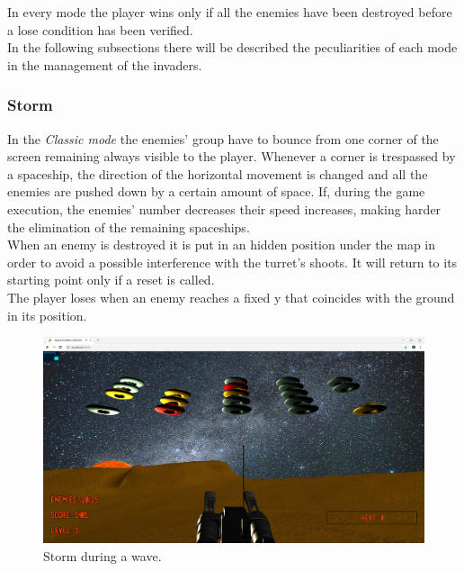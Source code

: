 In every mode the player wins only if all the enemies have been destroyed before a lose condition has been verified.\\
In the following subsections there will be described the peculiarities of each mode in the management of the invaders.

\subsubsection{Storm}
In the \textit{Classic mode} the enemies' group have to bounce from one corner of the screen remaining always visible to the player. Whenever a corner is trespassed by a spaceship, the direction of the horizontal movement is changed and all the enemies are pushed down by a certain amount of space. If, during the game execution, the enemies' number decreases their speed increases, making harder the elimination of the remaining spaceships. \\
When an enemy is destroyed it is put in an hidden position under the map in order to avoid a possible interference with the turret's shoots. It will return to its starting point only if a reset is called.\\
The player loses when an enemy reaches a fixed y that coincides with the ground in its position.
\begin{figure}[h!]
\begin{center}
\includegraphics[scale=0.18]{images/onGoing_Storm.png}
\caption{Storm during a wave.}
\end{center}
\end{figure}

